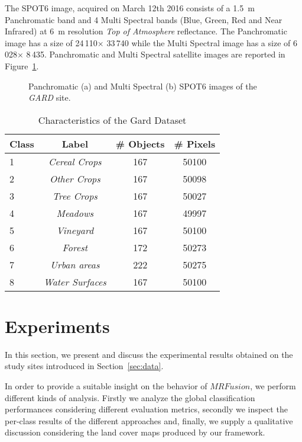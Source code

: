 \documentclass[journal]{IEEEtran}
\newcommand{\method}{$MRFusion$}
\begin{document}
The SPOT6 image, acquired on March 12th 2016 consists of a 1.5~m Panchromatic band and 4 Multi Spectral bands (Blue, Green, Red and Near Infrared) at 6~m resolution \textit{Top of Atmosphere} reflectance.
The Panchromatic image has a size of 24\,110$\times$ 33\,740 while the Multi Spectral image has a size of
6\,028$\times$ 8\,435. Panchromatic and Multi Spectral satellite images are reported in Figure~\ref{fig:Gard_PAN_XS}.


\begin{figure}[!ht]
\centering
{}
\caption{ Panchromatic (a) and Multi Spectral (b) SPOT6 images of the \textit{GARD} site. \label{fig:Gard_PAN_XS} }
\end{figure}\begin{table}[!ht]
\centering
\begin{tabular}{|l||c|c|c|}
	\hline
\textbf{Class} & Label & \# \textbf{Objects} & \# \textbf{Pixels} \\
\hline \hline
1 & {\em Cereal Crops} & 167 & 50100 \\ \hline
2 & {\em Other Crops} & 167 & 50098  \\ \hline
3 & {\em Tree Crops} & 167 & 50027 \\ \hline
4 & {\em Meadows} & 167 & 49997 \\ \hline
5 & {\em Vineyard} & 167 & 50100 \\ \hline
6 & {\em Forest} & 172 & 50273 \\ \hline
7 & {\em Urban areas} & 222 & 50275 \\ \hline
8 & {\em Water Surfaces} & 167 & 50100 \\ \hline
\end{tabular}
\caption{Characteristics of the Gard Dataset\label{tab:data_gard}}
\end{table}

\section{Experiments}
\label{sec:expe}
In this section, we present and discuss the experimental results obtained on the study sites introduced in Section~\ref{sec:data}.

In order to provide a suitable insight on the behavior of \method, we perform different kinds of analysis. Firstly we analyze the global classification performances considering different evaluation metrics, secondly we inspect the per-class results of the different approaches and, finally, we supply a qualitative discussion considering the land cover maps produced by our framework.
\end{document}
